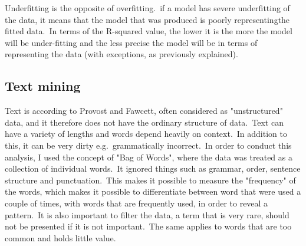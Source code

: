 \documentclass[12pt]{article}
\begin{document}

Underfitting is the opposite of overfitting.\ if a model has severe underfitting of the data, it  means that the model that was produced is poorly representingthe fitted data.\  In terms of the R-squared value, the lower it is the more the model will be under-fitting and the less precise the model will be in terms of representing the data (with exceptions, as previously explained).\citep{squared} \\













\subsection{Text mining}
Text is according to Provost and Fawcett, often considered as "unstructured" data, and it therefore does not have the ordinary structure of data.\ Text can have a variety of lengths and words depend heavily on context.\ In addition to this, it can be very dirty e.g.\ grammatically incorrect.\ In order to conduct this analysis, I used the concept of "Bag of Words", where the data was treated as a collection of individual words.\ It ignored things such as grammar, order, sentence structure and punctuation.\ This makes it possible to measure the "frequency" of the words, which makes it possible to differentiate between word that were used a couple of times, with words that are frequently used, in order to reveal a pattern.\ It is also important to filter the data, a term that is very rare, should not be presented if it is not important.\ The same applies to words that are too common and holds little value. \citep{foster}
\end{document}
